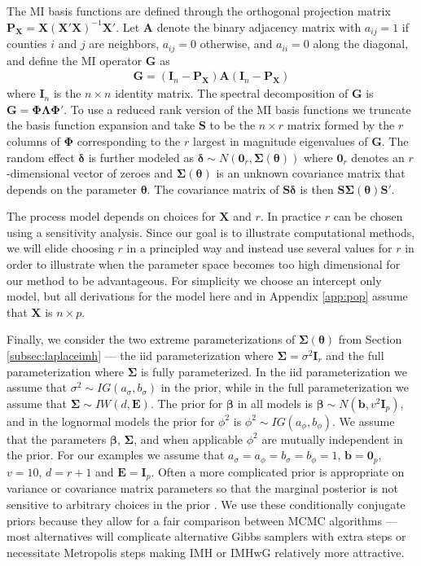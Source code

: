 \documentclass[12pt]{article}
\begin{document}
The MI basis functions are defined through the orthogonal projection matrix $\bm{P}_{\bm{X}} = \bm{X}(\bm{X}'\bm{X})^{-1}\bm{X}'$. Let $\bm{A}$ denote the binary adjacency matrix with $a_{ij} = 1$ if counties $i$ and $j$ are neighbors, $a_{ij}=0$ otherwise, and $a_{ii}=0$ along the diagonal, and define the MI operator $\bm{G}$ as
\begin{align*}
\bm{G} = (\bm{I}_n - \bm{P}_{\bm{X}})\bm{A}(\bm{I}_n - \bm{P}_{\bm{X}})
\end{align*}
where $\bm{I}_n$ is the $n\times n$ identity matrix. The spectral decomposition of $\bm{G}$ is $\bm{G} = \bm{\Phi}\bm{\Lambda}\bm{\Phi}'.$ To use a reduced rank version of the MI basis functions we truncate the basis function expansion and take $\bm{S}$ to be the $n\times r$ matrix formed by the $r$ columns of $\bm{\Phi}$ corresponding to the $r$ largest in magnitude eigenvalues of $\bm{G}$. The random effect $\bm{\delta}$ is further modeled as $\bm{\delta} \sim N(\bm{0}_r,\bm{\Sigma}(\bm{\theta}))$ where $\bm{0}_r$ denotes an $r$-dimensional vector of zeroes and $\bm{\Sigma}(\bm{\theta})$ is an unknown covariance matrix that depends on the parameter $\bm{\theta}$. The covariance matrix of $\bm{S}\bm{\delta}$ is then $\bm{S}\bm{\Sigma}(\bm{\theta})\bm{S}'$.

The process model depends on choices for $\bm{X}$ and $r$. In practice $r$ can be chosen using a sensitivity analysis. Since our goal is to illustrate computational methods, we will elide choosing $r$ in a principled way and instead use several values for $r$ in order to illustrate when the parameter space becomes too high dimensional for our method to be advantageous. For simplicity we choose an intercept only model, but all derivations for the model here and in Appendix \ref{app:pop} assume that $\bm{X}$ is $n\times p$.

Finally, we consider the two extreme parameterizations of $\bm{\Sigma}(\bm{\theta})$ from Section \ref{subsec:laplaceimh} --- the iid parameterization where $\bm{\Sigma}=\sigma^2\bm{I}_r$ and the full parameterization where $\bm{\Sigma}$ is fully parameterized. In the iid parameterization we assume that $\sigma^2 \sim IG(a_\sigma, b_\sigma)$ in the prior, while in the full parameterization we assume that $\bm{\Sigma}\sim IW(d, \bm{E})$. The prior for $\bm{\beta}$ in all models is $\bm{\beta} \sim N(\bm{b}, v^2\bm{I}_p)$, and in the lognormal models the prior for $\phi^2$ is $\phi^2 \sim IG(a_\phi, b_\phi)$. We assume that the parameters $\bm{\beta}$, $\bm{\Sigma}$, and when applicable $\phi^2$ are mutually independent in the prior. For our examples we assume that $a_\sigma = a_\phi = b_\sigma = b_\phi = 1$, $\bm{b} = \bm{0}_p$, $v = 10$, $d = r + 1$ and $\bm{E} = \bm{I}_p$. Often a more complicated prior is appropriate on variance or covariance matrix parameters so that the marginal posterior is not sensitive to arbitrary choices in the prior \citep{gelman2006prior}. We use these conditionally conjugate priors because they allow for a fair comparison between MCMC algorithms --- most alternatives will complicate alternative Gibbs samplers with extra steps or necessitate Metropolis steps making IMH or IMHwG relatively more attractive.
\end{document}
